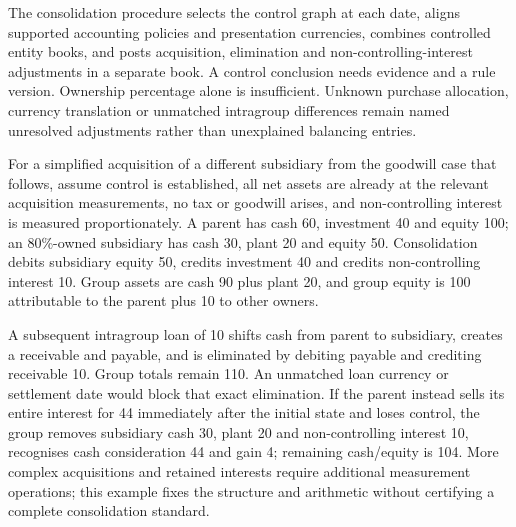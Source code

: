 The consolidation procedure selects the control graph at each date, aligns
supported accounting policies and presentation currencies, combines controlled
entity books, and posts acquisition, elimination and non-controlling-interest
adjustments in a separate book. A control conclusion needs evidence and a
rule version. Ownership percentage alone is insufficient. Unknown purchase
allocation, currency translation or unmatched intragroup differences remain
named unresolved adjustments rather than unexplained balancing entries.

For a simplified acquisition of a different subsidiary from the goodwill case
that follows, assume control is established, all net assets
are already at the relevant acquisition measurements, no tax or goodwill
arises, and non-controlling interest is measured proportionately. A parent
has cash 60, investment 40 and equity 100; an 80\%-owned subsidiary has cash
30, plant 20 and equity 50. Consolidation debits subsidiary equity 50,
credits investment 40 and credits non-controlling interest 10. Group assets
are cash 90 plus plant 20, and group equity is 100 attributable to the parent
plus 10 to other owners.

A subsequent intragroup loan of 10 shifts cash from parent to subsidiary,
creates a receivable and payable, and is eliminated by debiting payable and
crediting receivable 10. Group totals remain 110. An unmatched loan currency
or settlement date would block that exact elimination. If the parent instead
sells its entire interest for 44 immediately after the initial state and
loses control, the group removes subsidiary cash 30, plant 20 and
non-controlling interest 10, recognises cash consideration 44 and gain 4;
remaining cash/equity is 104. More complex acquisitions and retained interests
require additional measurement operations; this example fixes the structure
and arithmetic without certifying a complete consolidation standard.



